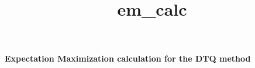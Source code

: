 \documentclass[10pt]{article}
\begin{document}
\vspace*{-15mm}
\title{em_calc}
\begin{center}
\Large\textbf{Expectation Maximization calculation for the DTQ method} \\
\normalsize
\end{center}
\end{document}
